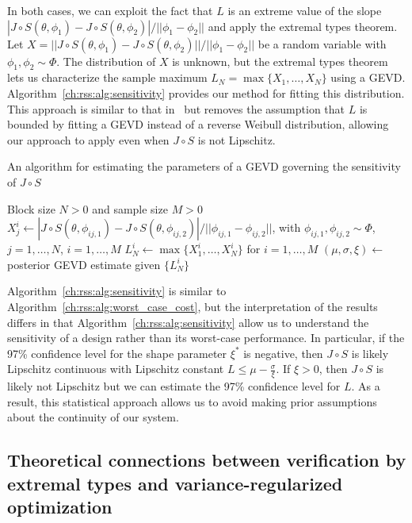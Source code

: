 In both cases, we can exploit the fact that $L$ is an extreme value of the slope $|J\circ S(\theta, \phi_1) - J\circ S(\theta, \phi_2)| / ||\phi_1 - \phi_2||$ and apply the extremal types theorem. Let $X = ||J\circ S(\theta, \phi_1) - J\circ S(\theta, \phi_2)|| / ||\phi_1 - \phi_2||$ be a random variable with $\phi_1, \phi_2 \sim \Phi$. The distribution of $X$ is unknown, but the extremal types theorem lets us characterize the sample maximum $L_N = \max\{X_1, \ldots, X_N\}$ using a GEVD. Algorithm~\ref{ch:rss:alg:sensitivity} provides our method for fitting this distribution. This approach is similar to that in~\cite{sridhar2021improving,knuthPlanningLearnedDynamics2021} but removes the assumption that $L$ is bounded by fitting a GEVD instead of a reverse Weibull distribution, allowing our approach to apply even when $J\circ S$ is not Lipschitz.
\begin{algorithm}
	\caption{An algorithm for estimating the parameters of a GEVD governing the sensitivity of $J \circ S$}\label{ch:rss:alg:sensitivity}
	\begin{algorithmic}
		\Require Block size $N > 0$ and sample size $M > 0$
		\State $X_j^i \gets |J\circ S(\theta, \phi_{ij,1}) - J\circ S(\theta, \phi_{ij,2})| / ||\phi_{ij,1} - \phi_{ij,2}||$, \hspace{2cm} \phantom{xxxxxxx} with $\phi_{ij,1}, \phi_{ij,2} \sim\Phi$, $j=1,\ldots,N$, $i=1,\ldots,M$
		\State $L_N^i \gets \max\{X_1^i, \ldots, X_N^i\}$ for $i=1,\ldots,M$
		\State $(\mu, \sigma, \xi) \gets$ posterior GEVD estimate given $\{L_N^i\}$
	\end{algorithmic}
\end{algorithm}

Algorithm~\ref{ch:rss:alg:sensitivity} is similar to Algorithm~\ref{ch:rss:alg:worst_case_cost}, but the interpretation of the results differs in that Algorithm~\ref{ch:rss:alg:sensitivity} allow us to understand the sensitivity of a design rather than its worst-case performance. In particular, if the 97\% confidence level for the shape parameter $\xi^*$ is negative, then $J\circ S$ is likely Lipschitz continuous with Lipschitz constant $L \leq \mu - \frac{\sigma}{\xi}$. If $\xi > 0$, then $J\circ S$ is likely not Lipschitz but we can estimate the 97\% confidence level for $L$. As a result, this statistical approach allows us to avoid making prior assumptions about the continuity of our system.

\subsection{Theoretical connections between verification by extremal types and variance-regularized optimization}\label{ch:rss:connection_to_robustness}

